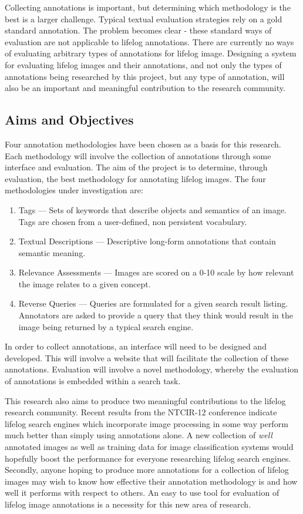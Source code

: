 \documentclass[12pt,a4paper]{article}
\begin{document}
Collecting annotations is important, but determining which methodology is the best is a larger challenge. Typical textual evaluation strategies rely on a gold standard annotation. The problem becomes clear - these standard ways of evaluation are not applicable to lifelog annotations. There are currently no ways of evaluating arbitrary types of annotations for lifelog image. Designing a system for evaluating lifelog images and their annotations, and not only the types of annotations being researched by this project, but any type of annotation, will also be an important and meaningful contribution to the research community. 

\subsection{Aims and Objectives}

Four annotation methodologies have been chosen as a basis for this research. Each methodology will involve the collection of annotations through some interface and evaluation. The aim of the project is to determine, through evaluation, the best methodology for annotating lifelog images. The four methodologies under investigation are: 

\begin{enumerate}
    \item Tags --- Sets of keywords that describe objects and semantics of an image. Tags are chosen from a user-defined, non persistent vocabulary.
    \item Textual Descriptions --- Descriptive long-form annotations that contain semantic meaning.
    \item Relevance Assessments --- Images are scored on a 0-10 scale by how relevant the image relates to a given concept.
    \item Reverse Queries --- Queries are formulated for a given search result listing. Annotators are asked to provide a query that they think would result in the image being returned by a typical search engine.
\end{enumerate}

In order to collect annotations, an interface will need to be designed and developed. This will involve a website that will facilitate the collection of these annotations. Evaluation will involve a novel methodology, whereby the evaluation of annotations is embedded within a search task. 

This research also aims to produce two meaningful contributions to the lifelog research community. Recent results from the NTCIR-12 conference indicate lifelog search engines which incorporate image processing in some way perform much better than simply using annotations alone. A new collection of \textit{well} annotated images as well as training data for image classification systems would hopefully boost the performance for everyone researching lifelog search engines. Secondly, anyone hoping to produce more annotations for a collection of lifelog images may wish to know how effective their annotation methodology is and how well it performs with respect to others. An easy to use tool for evaluation of lifelog image annotations is a necessity for this new area of research.
\end{document}
